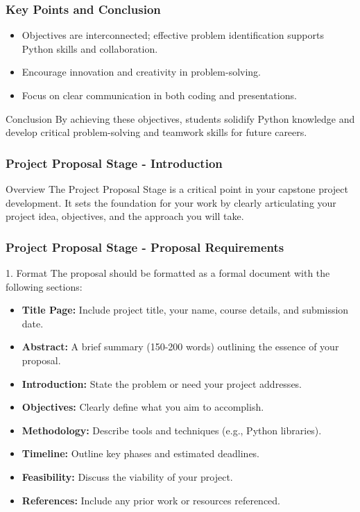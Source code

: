 \documentclass{beamer}
\begin{document}
\begin{frame}[fragile]
    \frametitle{Key Points and Conclusion}
    \begin{itemize}
        \item Objectives are interconnected; effective problem identification supports Python skills and collaboration.
        \item Encourage innovation and creativity in problem-solving.
        \item Focus on clear communication in both coding and presentations.
    \end{itemize}
    
    \begin{block}{Conclusion}
        By achieving these objectives, students solidify Python knowledge and develop critical problem-solving and teamwork skills for future careers.
    \end{block}
\end{frame}

\begin{frame}[fragile]
    \frametitle{Project Proposal Stage - Introduction}
    \begin{block}{Overview}
        The Project Proposal Stage is a critical point in your capstone project development. 
        It sets the foundation for your work by clearly articulating your project idea, objectives, and the approach you will take.
    \end{block}
\end{frame}

\begin{frame}[fragile]
    \frametitle{Project Proposal Stage - Proposal Requirements}
    \begin{block}{1. Format}
        The proposal should be formatted as a formal document with the following sections:
        \begin{itemize}
            \item \textbf{Title Page:} Include project title, your name, course details, and submission date.
            \item \textbf{Abstract:} A brief summary (150-200 words) outlining the essence of your proposal.
            \item \textbf{Introduction:} State the problem or need your project addresses.
            \item \textbf{Objectives:} Clearly define what you aim to accomplish.
            \item \textbf{Methodology:} Describe tools and techniques (e.g., Python libraries).
            \item \textbf{Timeline:} Outline key phases and estimated deadlines.
            \item \textbf{Feasibility:} Discuss the viability of your project.
            \item \textbf{References:} Include any prior work or resources referenced.
        \end{itemize}
    \end{block}
\end{frame}
\end{document}
